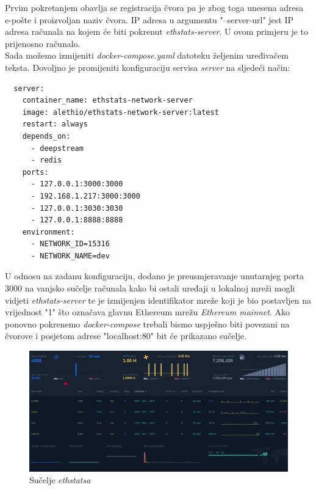 \documentclass[times, utf8, zavrsni, numeric]{fer}
\begin{document}
Prvim pokretanjem obavlja se registracija čvora pa je zbog toga unesena adresa e-pošte i proizvoljan naziv čvora. IP adresa u argumentu
"--server-url" jest IP adresa računala na kojem će biti pokrenut \emph{ethstats-server}. U ovom primjeru je to prijenosno računalo. \\
Sada možemo izmijeniti \emph{docker-compose.yaml} datoteku željenim uređivačem teksta. Dovoljno je promijeniti konfiguraciju servisa
\emph{server} na sljedeći način:
\begin{lstlisting}
  server:
    container_name: ethstats-network-server
    image: alethio/ethstats-network-server:latest
    restart: always
    depends_on:
      - deepstream
      - redis
    ports:
      - 127.0.0.1:3000:3000
      - 192.168.1.217:3000:3000
      - 127.0.0.1:3030:3030
      - 127.0.0.1:8888:8888
    environment:
      - NETWORK_ID=15316
      - NETWORK_NAME=dev
\end{lstlisting}

U odnosu na zadanu konfiguraciju, dodano je preusmjeravanje unutarnjeg porta 3000 na vanjsko sučelje računala kako bi ostali uređaji
u lokalnoj mreži mogli vidjeti \emph{ethstats-server} te je izmijenjen identifikator mreže koji je bio postavljen na vrijednost "1" što
označava glavnu Ethereum mrežu \emph{Ethereum mainnet}. Ako ponovno pokrenemo \emph{docker-compose} trebali bismo uspješno biti povezani
na čvorove i posjetom adrese "localhost:80" bit će prikazano sučelje.

\begin{figure}[ht]
  \includegraphics[width=\textwidth]{ethstatsDashboard.png}
  \caption{Sučelje \emph{ethstatsa}}
  \centering
\end{figure}
\end{document}
